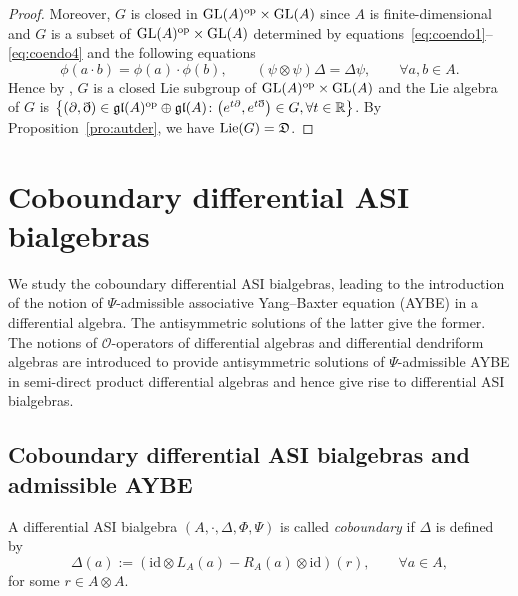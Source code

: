 \documentclass[10pt,a4paper]{amsart}
\numberwithin{equation}{section}
\newcommand{\id}{\mathrm{id}}
\begin{document}
\begin{proof}
Moreover, $G$ is closed in ${\rm GL}(A)^{\rm op} \times {\rm GL}(A)$ since $A$ is finite-dimensional and $G$ is a subset of ${\rm GL}(A)^{\rm op} \times {\rm GL}(A)$ determined by equations~\eqref{eq:coendo1}--\eqref{eq:coendo4} and the following equations
\begin{equation*}
 \phi(a \cdot b) = \phi(a) \cdot \phi(b), \qquad (\psi \otimes \psi) \Delta = \Delta \psi, \qquad \forall a, b \in A.
\end{equation*}
Hence by \cite[Theorem~6.9]{SW}, $G$ is a closed Lie subgroup of ${\rm GL}(A)^{\rm op} \times {\rm GL}(A)$ and the Lie algebra of $G$ is
$\big\{(\partial, \eth) \in \mathfrak{gl}(A)^{\rm op} \oplus \mathfrak{gl}(A)\colon \big(e^{t\partial}, e^{t\eth}\big) \in G, \forall t \in \mathbb{R}\big\}$.
By Proposition~\ref{pro:autder}, we have ${\rm Lie}(G) = \mathfrak{D}$.
\end{proof}



\section{Coboundary differential ASI bialgebras}\label{sec:cob}

We study the coboundary differential ASI bialgebras, leading to
the introduction of the notion of $\Psi$-admissible associative
Yang--Baxter equation (AYBE) in a differential algebra. The
antisymmetric solutions of the latter give the former. The notions
of $\mathcal{O}$-operators of differential algebras and
differential dendriform algebras are introduced to provide
antisymmetric solutions of $\Psi$-admissible AYBE in semi-direct
product differential algebras and hence give rise to differential
ASI bialgebras.


\subsection{Coboundary differential ASI bialgebras and admissible AYBE}\label{subsec:cobdasi}

\begin{Definition}\label{def:cobdasi}
 A differential ASI bialgebra $(A, \cdot, \Delta, \Phi, \Psi)$ is called \textit{coboundary}
 if $\Delta$ is defined by
 \begin{equation}
 \Delta(a) := (\id \otimes L_A(a) - R_A(a) \otimes \id)(r), \qquad \forall a \in A, \label{eq:cbd}
 \end{equation}
 for some $r \in A \otimes A$.
\end{Definition}
\end{document}
